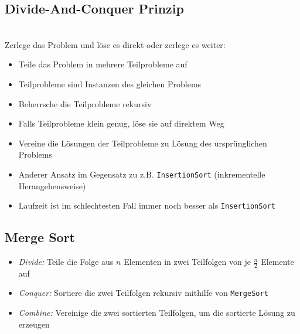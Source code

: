 \documentclass[
    ngerman,
    color=3b,
    dark_mode,
    load_common, %
    summary,
    boxarc,
]{rubos-tuda-template}
\begin{document}
\subsection{Divide-And-Conquer Prinzip}\label{Divide-And-Conquer}
\begin{idea}\mbox{}\\
    Zerlege das Problem und löse es direkt oder zerlege es weiter:
    \begin{description}[leftmargin=2cm,itemsep=1em]
        \item [Divide]
              \begin{itemize}
                  \item Teile das Problem in mehrere Teilprobleme auf
                  \item Teilprobleme sind Instanzen des gleichen Problems
              \end{itemize}
        \item [Conquer]
              \begin{itemize}
                  \item Beherrsche die Teilprobleme rekursiv
                  \item Falls Teilprobleme klein genug, löse sie auf direktem Weg
              \end{itemize}
        \item [Combine]
              \begin{itemize}
                  \item Vereine die Lösungen der Teilprobleme zu Lösung des ursprünglichen Problems
              \end{itemize}
    \end{description}
\end{idea}
\begin{itemize}
    \item Anderer Ansatz im Gegensatz zu z.B. \texttt{InsertionSort} (inkrementelle Herangehensweise)
    \item Laufzeit ist im schlechtesten Fall immer noch besser als \texttt{InsertionSort}
\end{itemize}
\clearpage
\subsection{Merge Sort} \label{Merge Sort}
\begin{idea}\mbox{}
    \begin{itemize}
        \item \textit{Divide:} Teile die Folge aus $n$ Elementen in zwei Teilfolgen von je $\frac{n}{2}$ Elemente auf
        \item \textit{Conquer:} Sortiere die zwei Teilfolgen rekursiv mithilfe von \texttt{MergeSort}
        \item \textit{Combine:} Vereinige die zwei sortierten Teilfolgen, um die sortierte Lösung zu erzeugen
    \end{itemize}
\end{idea}
\end{document}
